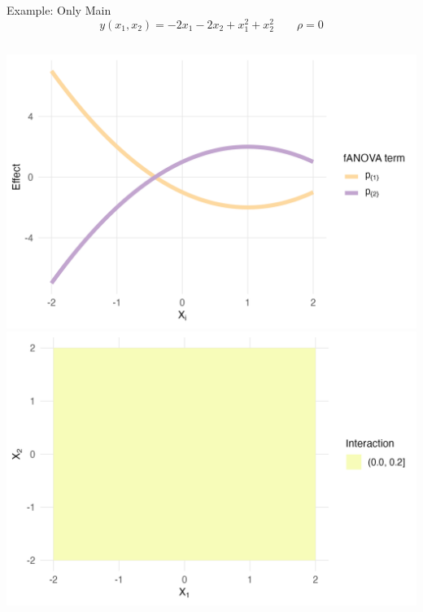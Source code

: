 \begin{frame}{Example: Only Main}
  \[
  y(x_1, x_2) = -2 x_1 - 2x_2 + x_1^2 + x_2^2 \qquad \rho = 0
  \]
    \begin{columns}
      \includegraphics[width=\linewidth]{../images/experiment_section/mixed_a1m20_a2p20_a11p10_a22m10_a12p00_rhop00_main.png}
      \includegraphics[width=\linewidth]{../images/experiment_section/mixed_a1m20_a2p20_a11p10_a22m10_a12p00_rhop00_interaction.png}
  \end{columns}
\end{frame}




